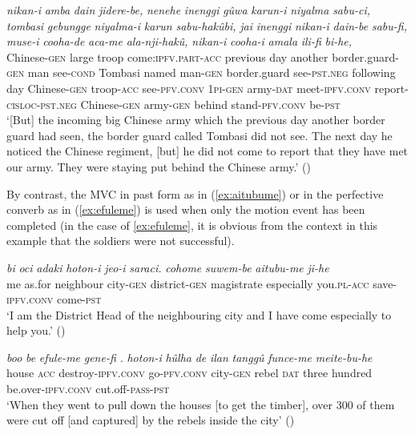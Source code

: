 \documentclass{article}
\newcommand{\ipa}[1]{\textit{{\phon\mbox{#1}}}} %
\begin{document}
\begin{exe}
\ex \label{ex:alanjihakv}
\gll \ipa{nikan-i} 	\ipa{amba} 	\ipa{dain} 	\ipa{jidere-be,} 	\ipa{nenehe} 	\ipa{inenggi} 	\ipa{gûwa} 	\ipa{karun-i} 	\ipa{niyalma} 	\ipa{sabu-ci,} 	\ipa{tombasi} 	\ipa{gebungge} 	\ipa{niyalma-i} 	\ipa{karun} 	\ipa{sabu-hakûbi,} 	\ipa{jai} 	\ipa{inenggi} 	\ipa{nikan-i} 	\ipa{dain-be} 	\ipa{sabu-fi,} 	\ipa{muse-i} 	\ipa{cooha-de} 	\ipa{aca-me} 	\ipa{ala-nji-hakû,} 	\ipa{nikan-i} 	\ipa{cooha-i} 	\ipa{amala} 	\ipa{ili-fi} 	\ipa{bi-he,} \\
Chinese-\textsc{gen} large troop come:\textsc{ipfv.part}-\textsc{acc} previous day another border.guard-\textsc{gen} man see-\textsc{cond} Tombasi named man-\textsc{gen} border.guard see-\textsc{pst.neg} following day Chinese-\textsc{gen} troop-\textsc{acc} see-\textsc{pfv.conv} \textsc{1pi-gen} army-\textsc{dat} meet-\textsc{ipfv.conv} report-\textsc{cisloc-pst.neg} Chinese-\textsc{gen} army-\textsc{gen} behind stand-\textsc{pfv.conv} be-\textsc{pst} \\
\glt ‘[But] the incoming big Chinese army which the previous day another border guard had seen, the border guard called Tombasi did not see. The next day he noticed the Chinese regiment, [but] he did not come to report that they have met our army. They were staying put behind the Chinese army.’ (\citealt[141, lines 5-8]{kanda55tongki})
\end{exe}
By contrast, the MVC in past form as in (\ref{ex:aitubume}) or in the perfective converb as in (\ref{ex:efuleme}) is used when only the motion event has been completed (in the case of \ref{ex:efuleme}, it is obvious from the context in this example that the soldiers were not successful).

\begin{exe}
\ex \label{ex:aitubume}
\gll
\ipa{bi}	\ipa{oci}	\ipa{adaki}	\ipa{hoton-i}	\ipa{jeo-i}	\ipa{saraci.}	\ipa{cohome}	\ipa{suwem-be}	\ipa{aitubu-me}	\ipa{ji-he} \\
me as.for neighbour city-\textsc{gen} district-\textsc{gen} magistrate especially you.\textsc{pl}-\textsc{acc} save-\textsc{ipfv.conv} come-\textsc{pst} \\
‘I am the District Head of the neighbouring city and I have come especially to help you.’ (\citealt[397;291]{stary83sakda})
\end{exe}

\begin{exe}
\ex \label{ex:efuleme}
\gll
 \ipa{boo} 	\ipa{be} 	\ipa{efule-me} 	\ipa{gene-fi} 	\ipa{.} 	\ipa{hoton-i} 	\ipa{hûlha} 	\ipa{de} 	\ipa{ilan} 	\ipa{tanggû} 	\ipa{funce-me} 	\ipa{meite-bu-he} \\
 house \textsc{acc} destroy-\textsc{ipfv.conv} go-\textsc{pfv.conv} { } city-\textsc{gen} rebel \textsc{dat} three hundred be.over-\textsc{ipfv.conv} cut.off-\textsc{pass-pst} \\
 \glt ‘When they went to pull down the houses [to get the timber], over 300 of them were cut off [and captured] by the rebels inside the city’ (\citealt[69/97]{cosmo06dzengseo})
\end{exe}
\end{document}
